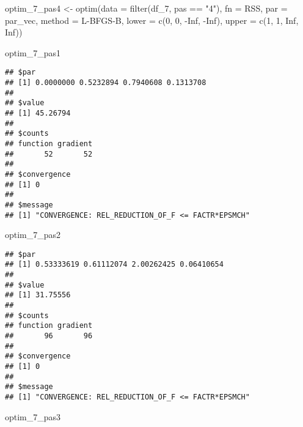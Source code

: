 \documentclass[
]{article}
\newenvironment{Shaded}{\begin{snugshade}}{\end{snugshade}}
\newcommand{\AttributeTok}[1]{\textcolor[rgb]{0.77,0.63,0.00}{#1}}
\newcommand{\ConstantTok}[1]{\textcolor[rgb]{0.00,0.00,0.00}{#1}}
\newcommand{\DecValTok}[1]{\textcolor[rgb]{0.00,0.00,0.81}{#1}}
\newcommand{\FunctionTok}[1]{\textcolor[rgb]{0.00,0.00,0.00}{#1}}
\newcommand{\NormalTok}[1]{#1}
\newcommand{\OtherTok}[1]{\textcolor[rgb]{0.56,0.35,0.01}{#1}}
\newcommand{\SpecialCharTok}[1]{\textcolor[rgb]{0.00,0.00,0.00}{#1}}
\newcommand{\StringTok}[1]{\textcolor[rgb]{0.31,0.60,0.02}{#1}}
\begin{document}
\begin{Shaded}
\begin{Highlighting}[]
\NormalTok{optim\_7\_pas4 }\OtherTok{\textless{}{-}} \FunctionTok{optim}\NormalTok{(}\AttributeTok{data =} \FunctionTok{filter}\NormalTok{(df\_7, pas }\SpecialCharTok{==} \StringTok{"4"}\NormalTok{), }\AttributeTok{fn =}\NormalTok{ RSS, }\AttributeTok{par =}\NormalTok{ par\_vec, }\AttributeTok{method =} \StringTok{\textquotesingle{}L{-}BFGS{-}B\textquotesingle{}}\NormalTok{, }\AttributeTok{lower =} \FunctionTok{c}\NormalTok{(}\DecValTok{0}\NormalTok{, }\DecValTok{0}\NormalTok{, }\SpecialCharTok{{-}}\ConstantTok{Inf}\NormalTok{, }\SpecialCharTok{{-}}\ConstantTok{Inf}\NormalTok{), }\AttributeTok{upper =} \FunctionTok{c}\NormalTok{(}\DecValTok{1}\NormalTok{, }\DecValTok{1}\NormalTok{, }\ConstantTok{Inf}\NormalTok{, }\ConstantTok{Inf}\NormalTok{))}
\end{Highlighting}
\end{Shaded}

\begin{Shaded}
\begin{Highlighting}[]
\NormalTok{optim\_7\_pas1}
\end{Highlighting}
\end{Shaded}

\begin{verbatim}
## $par
## [1] 0.0000000 0.5232894 0.7940608 0.1313708
## 
## $value
## [1] 45.26794
## 
## $counts
## function gradient 
##       52       52 
## 
## $convergence
## [1] 0
## 
## $message
## [1] "CONVERGENCE: REL_REDUCTION_OF_F <= FACTR*EPSMCH"
\end{verbatim}

\begin{Shaded}
\begin{Highlighting}[]
\NormalTok{optim\_7\_pas2}
\end{Highlighting}
\end{Shaded}

\begin{verbatim}
## $par
## [1] 0.53333619 0.61112074 2.00262425 0.06410654
## 
## $value
## [1] 31.75556
## 
## $counts
## function gradient 
##       96       96 
## 
## $convergence
## [1] 0
## 
## $message
## [1] "CONVERGENCE: REL_REDUCTION_OF_F <= FACTR*EPSMCH"
\end{verbatim}

\begin{Shaded}
\begin{Highlighting}[]
\NormalTok{optim\_7\_pas3}
\end{Highlighting}
\end{Shaded}
\end{document}
